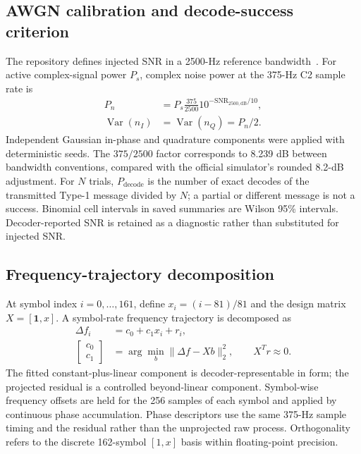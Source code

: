 \documentclass{ieeeaccess}
\begin{document}
\subsection{AWGN calibration and decode-success criterion}
The repository defines injected SNR in a 2500-Hz reference bandwidth~\cite{wsjtxguide}. For active complex-signal power $P_s$, complex noise power at the 375-Hz C2 sample rate is
\begin{align}
P_n &= P_s\frac{375}{2500}10^{-\mathrm{SNR}_{2500,\mathrm{dB}}/10},\label{eq:awgn}\\
\operatorname{Var}(n_I)&=\operatorname{Var}(n_Q)=P_n/2.\nonumber
\end{align}
Independent Gaussian in-phase and quadrature components were applied with deterministic seeds. The $375/2500$ factor corresponds to 8.239 dB between bandwidth conventions, compared with the official simulator's rounded 8.2-dB adjustment. For $N$ trials, $P_{\mathrm{decode}}$ is the number of exact decodes of the transmitted Type-1 message divided by $N$; a partial or different message is not a success. Binomial cell intervals in saved summaries are Wilson 95\% intervals. Decoder-reported SNR is retained as a diagnostic rather than substituted for injected SNR.

\subsection{Frequency-trajectory decomposition}
At symbol index $i=0,\ldots,161$, define $x_i=(i-81)/81$ and the design matrix $X=[\mathbf{1},x]$. A symbol-rate frequency trajectory is decomposed as
\begin{align}
\Delta f_i &= c_0+c_1x_i+r_i,\label{eq:decomposition}\\
\begin{bmatrix}c_0\\c_1\end{bmatrix}
&=\arg\min_b\|\Delta f-Xb\|_2^2,\qquad X^Tr\approx 0.\nonumber
\end{align}
The fitted constant-plus-linear component is decoder-representable in form; the projected residual is a controlled beyond-linear component. Symbol-wise frequency offsets are held for the 256 samples of each symbol and applied by continuous phase accumulation. Phase descriptors use the same 375-Hz sample timing and the residual rather than the unprojected raw process. Orthogonality refers to the discrete 162-symbol $[1,x]$ basis within floating-point precision.
\end{document}
